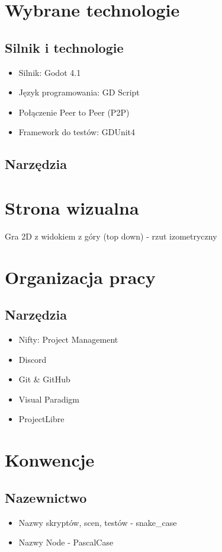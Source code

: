 \documentclass[]{report}
\begin{document}
\section{Wybrane technologie}
\subsection{Silnik i technologie}
	\begin{itemize}
		\item Silnik: Godot 4.1
		\item Język programowania: GD Script
		\item Połączenie Peer to Peer (P2P)
		\item Framework do testów: GDUnit4
	\end{itemize}
\subsection{Narzędzia}

\section{Strona wizualna}
Gra 2D z widokiem z góry (top down) - rzut izometryczny

\section{Organizacja pracy}
\subsection{Narzędzia}
	\begin{itemize}
		\item Nifty: Project Management
		\item Discord
		\item Git \& GitHub
		\item Visual Paradigm
		\item ProjectLibre
	\end{itemize}

\section{Konwencje}
\subsection{Nazewnictwo}
	\begin{itemize}
		\item Nazwy skryptów, scen, testów - snake_case
		\item Nazwy Node - PascalCase
	
	\end{itemize}
	
\end{document}
